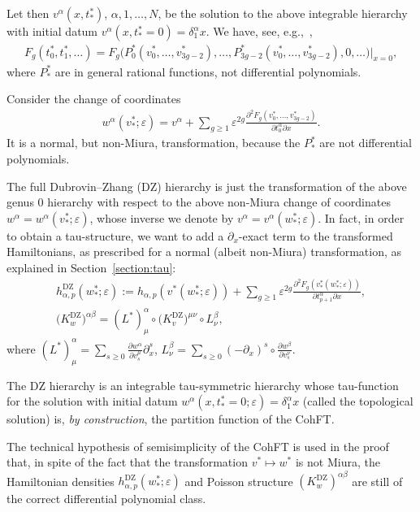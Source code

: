 \documentclass[pdftex]{sigma}
\numberwithin{equation}{section}
\def\d{{\partial}}
\newcommand{\<}{\left<}
\renewcommand{\>}{\right>}
\newcommand{\eps}{\varepsilon}
\newcommand{\DZ}{\mathrm{DZ}}
\begin{document}
Let then $v^\alpha(x,t^*_*)$, $\alpha,1,\dots,N$, be the solution to the above integrable hierarchy with initial datum $v^\alpha(x,t^*_*=0) = \delta^\alpha_1 x$. We have, see, e.g.,~\cite{BPS12a},
\begin{gather*}F_g(t^*_0,t^*_1,\dots) = F_g\big(P^*_0(v^*_0,\dots,v^*_{3g-2}),\dots,P^*_{3g-2}(v^*_0,\dots,v^*_{3g-2}),0,\dots \big)\big|_{x=0},\end{gather*}
where $P^*_*$ are in general rational functions, not dif\/ferential polynomials.

Consider the change of coordinates{\samepage
\begin{gather*}w^\alpha(v^*_*;\eps)=v^\alpha + \sum_{g\geq1}\eps^{2g} \frac{\d^2 F_g(v^*_0,\dots,v^*_{3g-2})}{\d t^\alpha_0 \d x}.\end{gather*}
It is a normal, but non-Miura, transformation, because the $P^*_*$ are not dif\/ferential polynomials.}

The full Dubrovin--Zhang (DZ) hierarchy is just the transformation of the above genus $0$ hierarchy with respect to the above non-Miura change of coordinates $w^\alpha = w^\alpha(v^*_*;\eps)$, whose inverse we denote by $v^\alpha = v^\alpha(w^*_*;\eps)$. In fact, in order to obtain a tau-structure, we want to add a $\d_x$-exact term to the transformed Hamiltonians, as prescribed for a normal (albeit non-Miura) transformation, as explained in Section~\ref{section:tau}:
\begin{gather*} h^{\DZ}_{\alpha,p}(w^*_*;\eps) := h_{\alpha,p}(v^*(w^*_*;\eps)) + \sum_{g\geq 1}\eps^{2g} \frac{\d^2 F_g(v^*_*(w^*_*;\eps))}{\d t^\alpha_{p+1} \d x},\\
\big(K^{\DZ}_w\big)^{\alpha\beta}=(L^*)^\alpha_\mu \circ \big(K_v^{\DZ}\big)^{\mu\nu} \circ L^\beta_\nu,
\end{gather*}
where $(L^*)^\alpha_\mu = \sum\limits_{s\geq 0} \frac{\partial w^\alpha}{\partial v^\mu_s} \partial_x^s$, $L^\beta_\nu = \sum\limits_{s\geq 0} (-\partial_x)^s \circ\frac{\partial w^\beta}{\partial v^\nu_s}$.

The DZ hierarchy is an integrable tau-symmetric hierarchy whose tau-function for the solution with initial datum $w^\alpha(x,t^*_*=0;\eps) = \delta^\alpha_1 x$ (called the topological solution) is, \emph{by construction}, the partition function of the CohFT.

The technical hypothesis of semisimplicity of the CohFT is used in the proof that, in spite of the fact that the transformation $v^* \mapsto w^*$ is not Miura, the Hamiltonian densities $h^{\DZ}_{\alpha,p}(w^*_*;\eps) $ and Poisson structure $(K^{\DZ}_w)^{\alpha\beta}$ are still of the correct dif\/ferential polynomial class.
\end{document}
